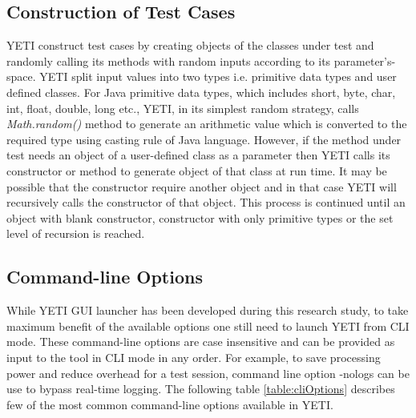 
\subsection{Construction of Test Cases}
YETI construct test cases by creating objects of the classes under test and randomly calling its methods with random inputs according to its parameter's-space. YETI split input values into two types i.e. primitive data types and user defined classes. For Java primitive data types, which includes short, byte, char, int, float, double, long etc., YETI, in its simplest random strategy, calls {\it Math.random()} method to generate an arithmetic value which is converted to the required type using casting rule of Java language. However, if the method under test needs an object of a user-defined class as a parameter then YETI calls its constructor or method to generate object of that class at run time. It may be possible that the constructor require another object and in that case YETI will recursively calls the constructor of that object. This process is continued until an object with blank constructor, constructor with only primitive types or the set level of recursion is reached.


\subsection{Command-line Options}
While YETI GUI launcher has been developed during this research study, to take maximum benefit of the available options one still need to launch YETI from CLI mode. These command-line options are case insensitive and can be provided as input to the tool in CLI mode in any order. For example, to save processing power and reduce overhead for a test session, command line option -nologs can be use to bypass real-time logging. The following table \ref{table:cliOptions} describes few of the most common command-line options available in YETI. 

